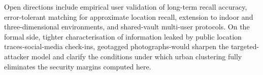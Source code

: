 \documentclass[journal,article,submit,pdftex,moreauthors]{Definitions/mdpi}
\newcommand{\add}[1]{#1}
\newcommand{\remove}[1]{}
\newcommand{\add}[1]{\added{#1}}
\newcommand{\remove}[1]{\deleted{#1}}
\begin{document}
\remove{Beyond the specific instantiation evaluated in this paper, the GeoVault design highlights a broader principle for key management: aligning cryptographic mechanisms with inherent human cognitive strengths can improve practical security without relying on purely abstract secrets. Future work will explore extensions to three-dimensional and indoor spatial environments, error-tolerant spatial matching mechanisms, multi-user or shared-vault scenarios, and formal analysis under stronger adversarial knowledge assumptions.}\add{Open directions include empirical user validation of long-term recall accuracy, error-tolerant matching for approximate location recall, extension to indoor and three-dimensional environments, and shared-vault multi-user protocols. On the formal side, tighter characterisation of information leaked by public location traces-social-media check-ins, geotagged photographs-would sharpen the targeted-attacker model and clarify the conditions under which urban clustering fully eliminates the security margins computed here.}
\end{document}
